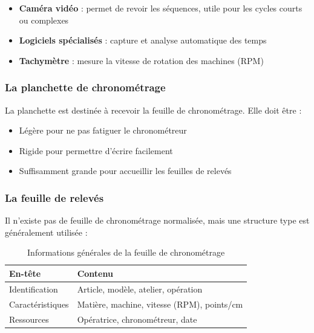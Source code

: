 \documentclass[a4paper,12pt]{article}
\begin{document}
\begin{itemize}
    \item \textbf{Caméra vidéo} : permet de revoir les séquences, utile pour les cycles courts ou complexes
    \item \textbf{Logiciels spécialisés} : capture et analyse automatique des temps
    \item \textbf{Tachymètre} : mesure la vitesse de rotation des machines (RPM)
\end{itemize}

\subsubsection{La planchette de chronométrage}

La planchette est destinée à recevoir la feuille de chronométrage. Elle doit être :
\begin{itemize}
    \item Légère pour ne pas fatiguer le chronométreur
    \item Rigide pour permettre d'écrire facilement
    \item Suffisamment grande pour accueillir les feuilles de relevés
\end{itemize}

\subsubsection{La feuille de relevés}

Il n'existe pas de feuille de chronométrage normalisée, mais une structure type est généralement utilisée :

\begin{table}[ht]
\centering
\begin{tabular}{|p{8cm}|p{6cm}|}
\hline
\textbf{En-tête} & \textbf{Contenu} \\
\hline
Identification & Article, modèle, atelier, opération \\
Caractéristiques & Matière, machine, vitesse (RPM), points/cm \\
Ressources & Opératrice, chronométreur, date \\
\hline
\end{tabular}
\caption{Informations générales de la feuille de chronométrage}
\end{table}
\end{document}
